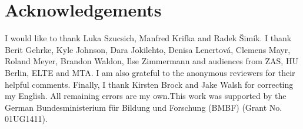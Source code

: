 \documentclass[output=paper,
  modfonts,
  newtxmath,
  hidelinks
		  ]{langscibook}
\begin{document}
 \section*{Acknowledgements}
I would like to thank Luka Szucsich, Manfred Krifka and Radek \v{S}imík. I thank Berit Gehrke, Kyle Johnson, Dara Jokilehto, Denisa Lenertová, Clemens Mayr, Roland Meyer, Brandon Waldon, Ilse Zimmermann and audiences from ZAS, HU Berlin, ELTE and MTA. I am also grateful to the anonymous reviewers for their helpful comments. Finally, I thank Kirsten Brock and Jake Walsh for correcting my English. All remaining errors are my own.\newline This work was supported by the German Bundesministerium für Bildung und Forschung (BMBF) (Grant No. 01UG1411).

\sloppy
\printbibliography[heading=subbibliography,notkeyword=this]
\end{document}
